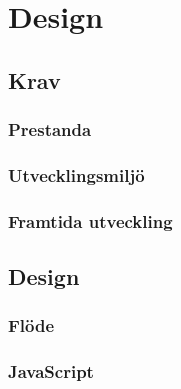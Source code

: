 \section{Design}

\subsection{Krav}
\subsubsection{Prestanda}
\subsubsection{Utvecklingsmiljö}
\subsubsection{Framtida utveckling}

\subsection{Design}
\subsubsection{Flöde}
\subsubsection{JavaScript}
